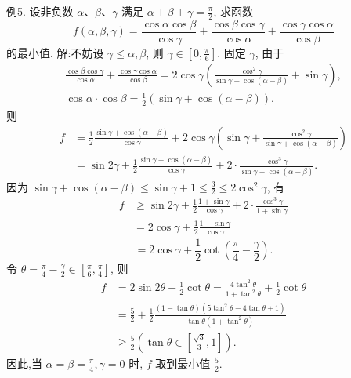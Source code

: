 例5. 设非负数 $\alpha 、 \beta 、 \gamma$ 满足 $\alpha+\beta+\gamma=\frac{\pi}{2}$, 求函数
$$
f(\alpha, \beta, \gamma)=\frac{\cos \alpha \cos \beta}{\cos \gamma}+\frac{\cos \beta \cos \gamma}{\cos \alpha}+\frac{\cos \gamma \cos \alpha}{\cos \beta}
$$
的最小值.
解:不妨设 $\gamma \leqslant \alpha, \beta$, 则 $\gamma \in\left[0, \frac{\pi}{6}\right]$. 固定 $\gamma$, 由于
$$
\begin{gathered}
\frac{\cos \beta \cos \gamma}{\cos \alpha}+\frac{\cos \gamma \cos \alpha}{\cos \beta}=2 \cos \gamma\left(\frac{\cos ^2 \gamma}{\sin \gamma+\cos (\alpha-\beta)}+\sin \gamma\right), \\
\cos \alpha \cdot \cos \beta=\frac{1}{2}(\sin \gamma+\cos (\alpha-\beta)) .
\end{gathered}
$$
则
$$
\begin{aligned}
f & =\frac{1}{2} \frac{\sin \gamma+\cos (\alpha-\beta)}{\cos \gamma}+2 \cos \gamma\left(\sin \gamma+\frac{\cos ^2 \gamma}{\sin \gamma+\cos (\alpha-\beta)}\right) \\
& =\sin 2 \gamma+\frac{1}{2} \frac{\sin \gamma+\cos (\alpha-\beta)}{\cos \gamma}+2 \cdot \frac{\cos ^3 \gamma}{\sin \gamma+\cos (\alpha-\beta)} .
\end{aligned}
$$
因为 $\sin \gamma+\cos (\alpha-\beta) \leqslant \sin \gamma+1 \leqslant \frac{3}{2} \leqslant 2 \cos ^2 \gamma$, 有
$$
\begin{aligned}
f & \geqslant \sin 2 \gamma+\frac{1}{2} \frac{1+\sin \gamma}{\cos \gamma}+2 \cdot \frac{\cos ^3 \gamma}{1+\sin \gamma} \\
& =2 \cos \gamma+\frac{1}{2} \frac{1+\sin \gamma}{\cos \gamma}
\end{aligned}
$$
$$
=2 \cos \gamma+\frac{1}{2} \cot \left(\frac{\pi}{4}-\frac{\gamma}{2}\right) .
$$
令 $\theta=\frac{\pi}{4}-\frac{\gamma}{2} \in\left[\frac{\pi}{6}, \frac{\pi}{4}\right]$, 则
$$
\begin{aligned}
f & =2 \sin 2 \theta+\frac{1}{2} \cot \theta=\frac{4 \tan ^2 \theta}{1+\tan ^2 \theta}+\frac{1}{2} \cot \theta \\
& =\frac{5}{2}+\frac{1}{2} \frac{(1-\tan \theta)\left(5 \tan ^2 \theta-4 \tan \theta+1\right)}{\tan \theta\left(1+\tan ^2 \theta\right)} \\
& \geqslant \frac{5}{2}\left(\tan \theta \in\left[\frac{\sqrt{3}}{3}, 1\right]\right) .
\end{aligned}
$$
因此,当 $\alpha=\beta=\frac{\pi}{4}, \gamma=0$ 时, $f$ 取到最小值 $\frac{5}{2}$.



